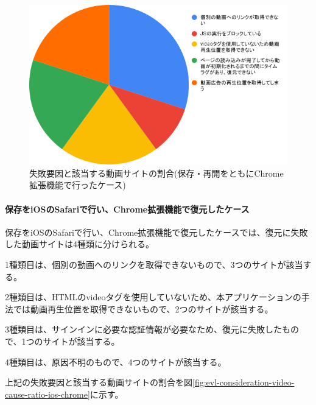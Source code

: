 \begin{figure}[htbp]
  \caption{失敗要因と該当する動画サイトの割合(保存・再開をともにChrome拡張機能で行ったケース)}
  \label{fig:evl-consideration-video-cause-ratio-chrome}
  \begin{center}
    \includegraphics[bb=0 0 600 371,width=15cm]{img/060_evaluation/consideration/video/cause-ratio-chrome.pdf}
  \end{center}
\end{figure}

\paragraph{保存をiOSのSafariで行い、Chrome拡張機能で復元したケース}
保存をiOSのSafariで行い、Chrome拡張機能で復元したケースでは、復元に失敗した動画サイトは4種類に分けられる。

1種類目は、個別の動画へのリンクを取得できないもので、3つのサイトが該当する。

2種類目は、HTMLのvideoタグを使用していないため、本アプリケーションの手法では動画再生位置を取得できないもので、2つのサイトが該当する。

3種類目は、サインインに必要な認証情報が必要なため、復元に失敗したもので、1つのサイトが該当する。

4種類目は、原因不明のもので、4つのサイトが該当する。

上記の失敗要因と該当する動画サイトの割合を図\ref{fig:evl-consideration-video-cause-ratio-ios-chrome}に示す。


